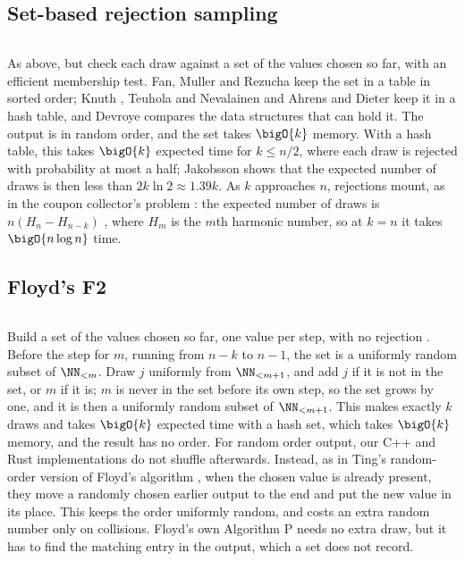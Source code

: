 \documentclass[letterpaper,11pt]{article}
\begin{document}
\subsection{Set-based rejection sampling}
\inputminted{Python}{code/rejectionsample.py}
As above, but check each draw against a set of the values chosen so
far, with an efficient membership test. Fan, Muller and Rezucha
\cite[Method 5]{fanetal} keep the set in a table in sorted order;
Knuth \cite[\S 3.4.2, exercise 16]{taocp2}, Teuhola and Nevalainen
\cite{teuhola} and Ahrens and Dieter
\cite{ahrensd} keep it in a hash table, and Devroye \cite[Chapter XII \S 2]{devroye}
compares the data structures that can hold it. The output is in random
order, and the set takes \(\bigO{k}\) memory. With a hash table, this
takes \(\bigO{k}\) expected time for \(k \leq n/2\), where each draw is
rejected with probability at most a half; Jakobsson \cite{jakobsson}
shows that the expected number of draws is then less than
\(2k \ln 2 \approx 1.39k\). As \(k\) approaches \(n\), rejections
mount, as in the coupon collector's problem \cite[Chapter IX \S 3,
pp.~224--225]{feller}: the expected number of draws is \(n(H_n - H_{n-k})\)
\cite[\S 6.3, p.~300]{goodman}, where \(H_m\) is the \(m\)th harmonic
number, so at \(k = n\) it takes
\(\bigO{n \log n}\) time.

\subsection{Floyd's F2}
\inputminted{Python}{code/floydf2.py}
Build a set of the values chosen so far, one value per step, with no
rejection \cite{floydf2}. Before the step for \(m\), running from
\(n - k\) to \(n - 1\), the set is a uniformly random subset of
\(\NN_{<m}\). Draw \(j\) uniformly from \(\NN_{<m + 1}\), and add
\(j\) if it is not in the set, or \(m\) if it is; \(m\) is never in the
set before its own step, so the set grows by one, and it is then a
uniformly random subset of \(\NN_{<m + 1}\). This makes exactly \(k\)
draws and takes \(\bigO{k}\) expected time with a hash set, which
takes \(\bigO{k}\) memory, and the result has no order. For random
order output, our C++ and Rust implementations do not shuffle
afterwards. Instead, as in Ting's random-order version of Floyd's
algorithm \cite{tingblog}, when the chosen value is already present,
they move a randomly chosen earlier output to the end and put the new
value in its place. This keeps the order uniformly random, and costs an
extra random number only on collisions. Floyd's own Algorithm P
\cite{floydf2} needs no extra draw, but it has to find the matching
entry in the output, which a set does not record.
\end{document}

